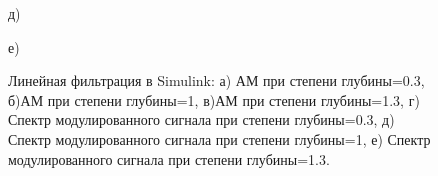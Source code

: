 \documentclass[10pt,a4paper]{article}
\begin{document}
\begin{figure}[H]
\begin{minipage}[h]{0.6\linewidth}
 д) \\
\end{minipage}
\begin{minipage}[h]{0.6\linewidth}
 е) \\
\end{minipage}
\caption{Линейная фильтрация в Simulink: а)
АМ при степени глубины=0.3, б)АМ при степени глубины=1, в)АМ при степени глубины=1.3, г) Спектр модулированного сигнала при степени глубины=0.3, д) Спектр модулированного сигнала при степени глубины=1, е) Спектр модулированного сигнала при степени глубины=1.3.}
\label{ris:experimentalcorrelationsignals}
\end{figure}
\FloatBarrier
\end{document}
